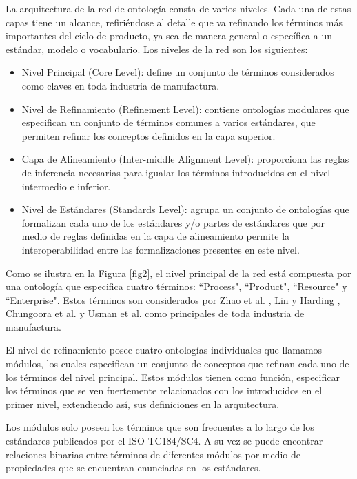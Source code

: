 \documentclass[journal]{IEEEtran}
\begin{document}
La arquitectura de la red de ontolog\'ia consta de varios niveles. Cada una de estas capas tiene un alcance, refiri\'endose al detalle que va refinando los t\'erminos m\'as importantes del ciclo de producto, ya sea de manera general o espec\'ifica a un est\'andar, modelo o vocabulario. Los niveles de la red son los siguientes:

\begin{itemize}
    \item Nivel Principal (Core Level): define un conjunto de t\'erminos considerados como claves en toda industria de manufactura.
    \item Nivel de Refinamiento (Refinement Level): contiene ontolog\'ias modulares que especifican un conjunto de t\'erminos comunes a varios est\'andares, que permiten refinar los conceptos definidos en la capa superior.
    \item Capa de Alineamiento (Inter-middle Alignment Level): proporciona las reglas de inferencia necesarias para igualar los t\'erminos introducidos en el nivel intermedio e inferior.
    \item Nivel de Est\'andares (Standards Level): agrupa un conjunto de ontolog\'ias que formalizan cada uno de los est\'andares y/o partes de est\'andares que por medio de reglas definidas en la capa de alineamiento permite la interoperabilidad entre las formalizaciones presentes en este nivel.  
\end{itemize}

Como se ilustra en la Figura \ref{fig2}, el nivel principal de la red est\'a compuesta por una ontolog\'ia que especifica cuatro t\'erminos: ``Process", ``Product", ``Resource" y ``Enterprise". Estos t\'erminos son considerados por Zhao et al. \cite{Zhao1999}, Lin y Harding \cite{Lin2007},  Chungoora et al. \cite{Chungoora2013c} y Usman et al. \cite{Usman2013} como principales de toda industria de manufactura.

El nivel de refinamiento posee cuatro ontolog\'ias individuales que llamamos m\'odulos, los cuales especifican un conjunto de conceptos que refinan cada uno de los t\'erminos del nivel principal. Estos m\'odulos tienen como funci\'on, especificar los t\'erminos que se ven fuertemente relacionados con los introducidos en el primer nivel, extendiendo as\'i, sus definiciones en la arquitectura.

Los m\'odulos solo poseen los t\'erminos que son frecuentes a lo largo de los est\'andares publicados por el ISO TC184/SC4. A su vez se puede encontrar relaciones binarias entre t\'erminos de diferentes m\'odulos por medio de propiedades que se encuentran enunciadas en los est\'andares.
\end{document}
